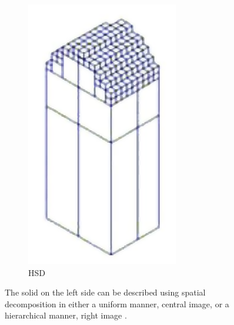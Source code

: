 \begin{description}
\begin{figure}[H]
\begin{subfigure}[b]{0.2\textwidth}
			\includegraphics[width=\textwidth]{images/spatial_decomposition_hsd}
			\caption{HSD}
			\label{fig:spatial_decomposition_hsd}
		\end{subfigure}
		\caption[USD and HSD]{
			The solid on the left side can be described using spatial decomposition in either a uniform manner, central image, or a hierarchical manner, right image \cite{virtual_machining_review}.
		}
		\label{fig:spatial_decomposition}
	\end{figure}



\end{description}
